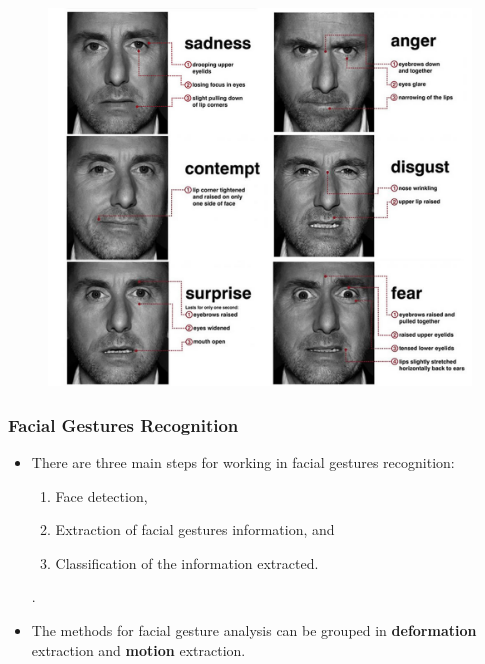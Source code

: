\documentclass[compress]{beamer}
\begin{document}
\begin{frame}
		\begin{figure}
		\centering	
		\includegraphics[scale=0.3]{img/microexpressions2.jpg}
	\end{figure}
\end{frame}

\begin{frame}
	\frametitle{Facial Gestures Recognition}
	\begin{itemize}
	\item There are three main steps for working in facial gestures recognition:
		\begin{enumerate}
		\item Face detection,
		\item Extraction of facial gestures information, and 
		\item Classification of the information extracted.
		\end{enumerate}.
	\item The methods for facial gesture analysis can be grouped in \textbf{deformation} extraction and \textbf{motion} extraction.
	\end{itemize}
\end{frame}
\end{document}
